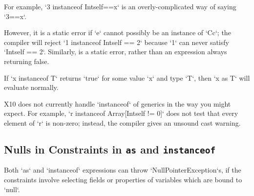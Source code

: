 For example, \xcd`3 instanceof Int{self==x}` is an overly-complicated way of
saying \xcd`3==x`.



However, it is a static error if \xcd`e` cannot possibly be an instance of
\xcd`C{c}`; the compiler will reject \xcd`1 instanceof Int{self == 2}` because
\xcd`1` can never satisfy \xcd`Int{self == 2}`. Similarly,  is a static error, rather than an expression always returning false. 

If \xcd`x instanceof T` returns \xcd`true` for some value \xcd`x` and type
\xcd`T`, then \xcd`x as T` will evaluate normally.  


\limitationx
X10 does not currently handle \xcd`instanceof` of generics in the way you
might expect.  For example, \xcd`r instanceof Array[Int{self != 0}]` does
not test that every element of \xcd`r` is non-zero; instead, the compiler
gives an unsound cast warning.


\subsection{Nulls in Constraints in {\tt as} and {\tt instanceof}}

Both \xcd`as` and \xcd`instanceof` expressions can throw
\xcd`NullPointerException`s, if the constraints involve selecting fields
or properties of variables which are bound to \xcd`null`.  

